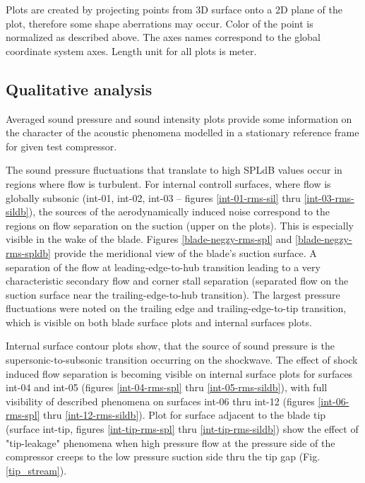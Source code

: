 Plots are created by projecting points from 3D surface onto a 2D plane of the plot, therefore some shape aberrations may occur. Color of the point is normalized as described above. The axes names correspond to the global coordinate system axes. Length unit for all plots is meter.

\subsection{Qualitative analysis} \label{rms_res_qual}
Averaged sound pressure and sound intensity plots provide some information on the character of the acoustic phenomena modelled in a stationary reference frame for given test compressor.

The sound pressure fluctuations that translate to high SPLdB values occur in regions where flow is turbulent. For internal controll surfaces, where flow is globally subsonic (int-01, int-02, int-03 -- figures \ref{int-01-rms-sil} thru \ref{int-03-rms-sildb}), the sources of the aerodynamically induced noise correspond to the regions on flow separation on the suction (upper on the plots). This is especially visible in the wake of the blade. Figures \ref{blade-negzy-rms-spl} and \ref{blade-negzy-rms-spldb} provide the meridional view of the blade's suction surface. A separation of the flow at leading-edge-to-hub transition leading to a very characteristic secondary flow and corner stall separation (separated flow on the suction surface near the trailing-edge-to-hub transition). The largest pressure fluctuations were noted on the trailing edge and trailing-edge-to-tip transition, which is visible on both blade surface plots and internal surfaces plots.

Internal surface contour plots show, that the source of sound pressure is the supersonic-to-subsonic transition occurring on the shockwave. The effect of shock induced flow separation is becoming visible on internal surface plots for surfaces int-04 and int-05 (figures \ref{int-04-rms-spl} thru \ref{int-05-rms-sildb}), with full visibility of described phenomena on surfaces int-06 thru int-12 (figures \ref{int-06-rms-spl} thru \ref{int-12-rms-sildb}). Plot for surface adjacent to the blade tip (surface int-tip, figures \ref{int-tip-rms-spl} thru \ref{int-tip-rms-sildb}) show the effect of "tip-leakage" phenomena when high pressure flow at the pressure side of the compressor creeps to the low pressure suction side thru the tip gap (Fig. \ref{tip_stream}). 

